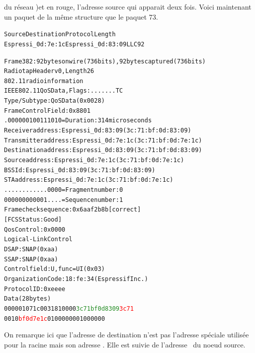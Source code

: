             du réseau \espmesh)et en rouge, l'adresse source qui apparait deux fois.
            Voici maintenant un paquet de la même structure que le paquet 73.
            \begin{alltt}
Source                Destination           Protocol Length
Espressi_0d:7e:1c     Espressi_0d:83:09     LLC      92    
            
Frame 382: 92 bytes on wire (736 bits), 92 bytes captured (736 bits)
Radiotap Header v0, Length 26
802.11 radio information
IEEE 802.11 QoS Data, Flags: .......TC
    Type/Subtype: QoS Data (0x0028)
    Frame Control Field: 0x8801
    .000 0001 0011 1010 = Duration: 314 microseconds
    Receiver address: Espressi_0d:83:09 (3c:71:bf:0d:83:09)
    Transmitter address: Espressi_0d:7e:1c (3c:71:bf:0d:7e:1c)
    Destination address: Espressi_0d:83:09 (3c:71:bf:0d:83:09)
    Source address: Espressi_0d:7e:1c (3c:71:bf:0d:7e:1c)
    BSS Id: Espressi_0d:83:09 (3c:71:bf:0d:83:09)
    STA address: Espressi_0d:7e:1c (3c:71:bf:0d:7e:1c)
    .... .... .... 0000 = Fragment number: 0
    0000 0000 0001 .... = Sequence number: 1
    Frame check sequence: 0x6aaf2b8b [correct]
    [FCS Status: Good]
    Qos Control: 0x0000
Logical-Link Control
    DSAP: SNAP (0xaa)
    SSAP: SNAP (0xaa)
    Control field: U, func=UI (0x03)
    Organization Code: 18:fe:34 (Espressif Inc.)
    Protocol ID: 0xeeee
Data (28 bytes)
0000  01 07 1c 00 31 81 00 00 \textcolor{ForestGreen}{3c 71 bf 0d 83 09} \textcolor{red}{3c 71}
0010  \textcolor{red}{bf 0d 7e 1c} 01 00 00 00 01 00 00 00            
            \end{alltt}
            On remarque ici que l'adresse de destination n'est pas l'adresse spéciale utilisée pour
            la racine mais son adresse \mac. Elle est suivie de l'adresse \mac\ du noeud source.

